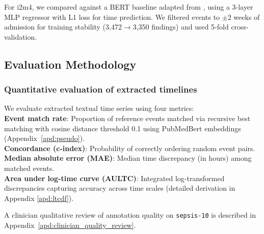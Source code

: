 \documentclass[pmlr,twocolumn,10pt]{jmlr} %
\begin{document}
For i2m4, we compared against a BERT baseline adapted from \cite{frattallone2024using}, using a 3-layer MLP regressor with L1 loss for time prediction. We filtered events to $\pm$2 weeks of admission for training stability (3,472$\rightarrow$3,350 findings) and used 5-fold cross-validation.


\subsection{Evaluation Methodology}
\subsubsection{Quantitative evaluation of extracted timelines}
\label{sec:evaluation_methodology_metrics}
We evaluate extracted textual time series using four metrics:\\
\textbf{Event match rate}: Proportion of reference events matched via recursive best matching with cosine distance threshold 0.1 using PubMedBert embeddings (Appendix~\ref{apd:pseudo}).\\
\textbf{Concordance (c-index)}: Probability of correctly ordering random event pairs.\\
\textbf{Median absolute error (MAE)}: Median time discrepancy (in hours) among matched events.\\
\textbf{Area under log-time curve (AULTC)}: Integrated log-transformed discrepancies capturing accuracy across time scales (detailed derivation in Appendix \ref{apd:ltcdf}).

A clinician qualitative review of annotation quality on \texttt{sepsis-10} is described in Appendix~\ref{apd:clinician_quality_review}.



\end{document}
